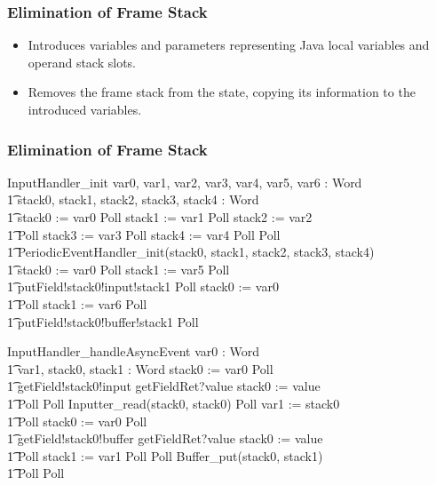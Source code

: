 \documentclass{beamer}
\begin{document}
\begin{frame}
  \frametitle{Elimination of Frame Stack}
  \begin{itemize}
  \item Introduces variables and parameters representing Java local
    variables and operand stack slots.
  \item Removes the frame stack from the state, copying its
    information to the introduced variables.
  \end{itemize}
\end{frame}

\begin{frame}[shrink]
  \frametitle{Elimination of Frame Stack}
  \setlength{\zedleftsep}{0cm}
  \setlength{\zedindent}{0cm}
  \begin{circus}
    InputHandler\_init \circdef \circval var0, var1, var2, var3, var4, var5, var6 : Word  \circspot \\
    \t1 \circvar stack0, stack1, stack2, stack3, stack4 : Word \circspot \\
    \t1 stack0 := var0 \circseq Poll \circseq stack1 := var1 \circseq Poll \circseq stack2 := var2 \circseq \\
    \t1 Poll \circseq stack3 := var3 \circseq Poll \circseq stack4 := var4 \circseq Poll \circseq Poll \\
    \t1 PeriodicEventHandler\_init(stack0, stack1, stack2, stack3, stack4) \circseq \\
    \t1 stack0 := var0 \circseq Poll \circseq stack1 := var5 \circseq Poll \circseq \\
    \t1 putField!stack0!input!stack1 \then \Skip \circseq Poll \circseq stack0 := var0 \circseq \\
    \t1 Poll \circseq stack1 := var6 \circseq Poll \circseq \\
    \t1 putField!stack0!buffer!stack1 \then \Skip \circseq Poll
  \end{circus}
  \begin{circus}
    InputHandler\_handleAsyncEvent \circdef \circval var0 : Word \circspot \\
    \t1 \circvar var1, stack0, stack1 : Word \circspot stack0 := var0 \circseq Poll \circseq \\
    \t1 getField!stack0!input \then getFieldRet?value \then stack0 := value \circseq \\
    \t1 Poll \circseq Poll \circseq Inputter\_read(stack0, stack0) \circseq Poll \circseq var1 := stack0 \circseq \\
    \t1 Poll \circseq stack0 := var0 \circseq Poll \circseq \\
    \t1 getField!stack0!buffer \then getFieldRet?value \then stack0 := value \circseq \\
    \t1 Poll \circseq stack1 := var1 \circseq Poll \circseq Poll \circseq Buffer\_put(stack0, stack1) \circseq \\
    \t1 Poll \circseq Poll
  \end{circus}
\end{frame}
\end{document}
